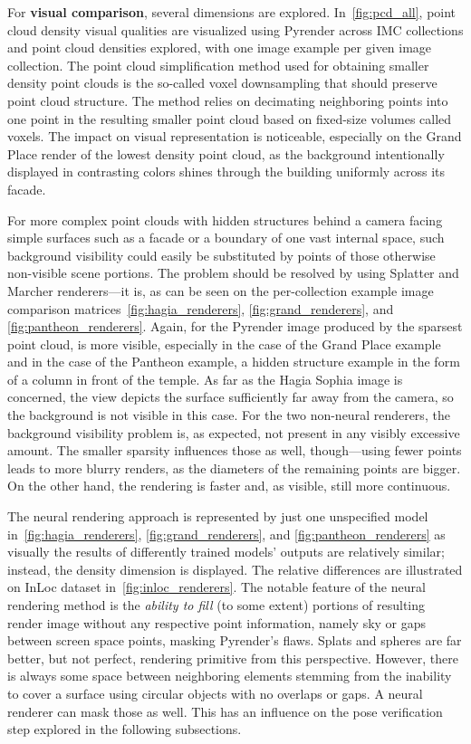 For \textbf{visual comparison}, several dimensions are explored.
In~\cref{fig:pcd_all}, point cloud density visual qualities are
visualized using Pyrender across IMC collections and point cloud
densities explored, with one image example per given image collection.
The point cloud simplification method used for obtaining smaller density
point clouds is the so-called voxel downsampling that should preserve point
cloud structure. The method relies on decimating neighboring points into
one point in the resulting smaller point cloud based on fixed-size volumes called
voxels. The impact on visual representation is noticeable, especially
on the Grand Place render of the lowest density point cloud, as the background
intentionally displayed in contrasting colors shines through the
building uniformly across its facade.

For more complex point clouds with hidden structures behind a camera
facing simple surfaces such as a facade or a boundary of one vast
internal space, such background visibility could easily be substituted by
points of those otherwise non-visible scene portions. The
problem should be resolved by using Splatter and Marcher renderers---it
is, as can be seen on the per-collection example image comparison
matrices~\cref{fig:hagia_renderers}, \cref{fig:grand_renderers}, and
\cref{fig:pantheon_renderers}. Again, for the Pyrender image produced by
the sparsest point cloud,  is more visible, especially
in the case of the Grand Place example and in the case of the Pantheon
example, a hidden structure example in the form of a column in front of
the temple. As far as the Hagia Sophia image is concerned, the view depicts
the surface sufficiently far away from the camera, so the background is
not visible in this case. For the two non-neural renderers, the background
visibility problem is, as expected, not present in any visibly excessive
amount. The smaller sparsity influences those as well, though---using
fewer points leads to more blurry renders, as the diameters of the
remaining points are bigger. On the other hand, the rendering is faster
and, as visible, still more continuous. 

The neural rendering approach is represented by just one unspecified
model in~\cref{fig:hagia_renderers}, \cref{fig:grand_renderers}, and
\cref{fig:pantheon_renderers} as visually the results of differently
trained models' outputs are relatively similar; instead, the density
dimension is displayed. The relative differences are illustrated on InLoc
dataset in~\cref{fig:inloc_renderers}. The notable feature of the
neural rendering method is the \emph{ability to fill} (to some extent)
portions of resulting render image without any respective point
information, namely sky or gaps between screen space points, masking
Pyrender's flaws. Splats and spheres are far better, but not perfect,
rendering primitive from this perspective. However, there is always
some space between neighboring elements stemming from the inability
to cover a surface using circular objects with no overlaps or gaps.
A neural renderer can mask those as well. This has an influence on
the pose verification step explored in the following subsections.

